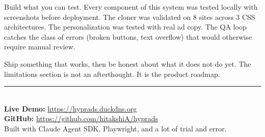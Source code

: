 \documentclass{article}
\begin{document}
Build what you can test. Every component of this system was tested locally with screenshots before deployment. The cloner was validated on 8 sites across 3 CSS architectures. The personalization was tested with real ad copy. The QA loop catches the class of errors (broken buttons, text overflow) that would otherwise require manual review.

Ship something that works, then be honest about what it does not do yet. The limitations section is not an afterthought. It is the product roadmap.

\vspace{2em}
\begin{center}
\textcolor{accent}{\rule{0.5\textwidth}{2pt}}\\[1em]
\textbf{Live Demo:} \url{https://hyprads.duckdns.org}\\
\textbf{GitHub:} \url{https://github.com/hitakshiA/hyprads}\\[0.5em]
\textcolor{muted}{Built with Claude Agent SDK, Playwright, and a lot of trial and error.}
\end{center}
\end{document}
